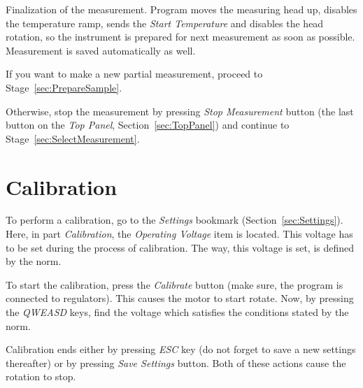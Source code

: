 \documentclass[a4paper,11pt,twoside]{book}
\theoremstyle{named}
\begin{document}
Finalization of the measurement. Program moves the measuring head up, disables
the temperature ramp, sends the \textit{Start Temperature} and disables the head
rotation, so the instrument is prepared for next measurement as soon as
possible. Measurement is saved automatically as well.

If you want to make a new partial measurement, proceed to
Stage~\ref{sec:PrepareSample}.

Otherwise, stop the measurement by pressing \textit{Stop Measurement} button
(the last button on the \textit{Top Panel}, Section~\ref{sec:TopPanel}) and
continue to Stage~\ref{sec:SelectMeasurement}.


\section{Calibration}
\label{sec:Calibration}

To perform a calibration, go to the \textit{Settings} bookmark
(Section~\ref{sec:Settings}). Here, in part \textit{Calibration}, the
\textit{Operating Voltage} item is located. This voltage has to be set during the
process of calibration. The way, this voltage is set, is defined by the norm.

To start the calibration, press the \textit{Calibrate} button (make sure, the
program is connected to regulators). This causes the motor to start rotate. Now,
by pressing the \textit{QWEASD} keys, find the voltage which satisfies the
conditions stated by the norm. 

Calibration ends either by pressing \textit{ESC} key (do not forget to save a new
settings thereafter) or by pressing \textit{Save Settings} button. Both of these
actions cause the rotation to stop.
\end{document}
